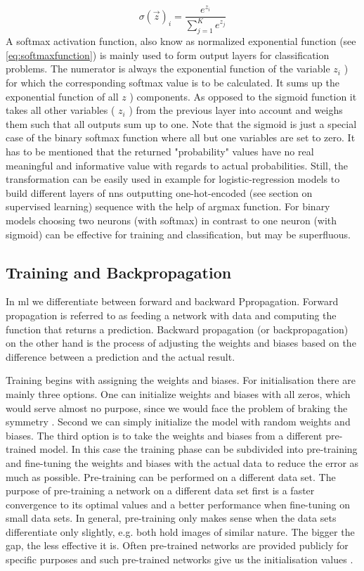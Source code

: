 \begin{equation}
   \sigma(\vec{z})_{i}=\frac{e^{z_{i}}}{\sum_{j=1}^{K} e^{z_{j}}}
\label{eq:softmaxfunction}
\end{equation}
A softmax activation function, also know as normalized exponential function (see \cref{eq:softmaxfunction}) is mainly used to form output layers for classification problems. The numerator is always the exponential function of the variable \( z_i \) ) for which the corresponding softmax value is to be calculated. It sums up the exponential function of all \( z \) ) components. As opposed to the sigmoid function it takes all other variables ( \( z_i \) ) from the previous layer into account and weighs them such that all outputs sum up to one. Note that the sigmoid is just a special case of the binary softmax function where all but one variables are set to zero. It has to be mentioned that the returned "probability" values have no real meaningful and informative value with regards to actual probabilities. Still, the transformation can be easily used in example for \gls{logistic-regression} models to build different layers of \acrshort{nn}s outputting one-hot-encoded (see section on supervised learning) sequence with the help of argmax function. For binary models choosing two neurons (with softmax) in contrast to one neuron (with sigmoid) can be effective for training and classification, but may be superfluous.

\subsection{Training and Backpropagation}

In \acrshort{ml} we differentiate between forward and backward Ppropagation. Forward propagation is referred to as feeding a network with data and computing the function that returns a prediction. Backward propagation (or backpropagation) on the other hand is the process of adjusting the weights and biases based on the difference between a prediction and the actual result.

Training begins with assigning the weights and biases. For initialisation there are mainly three options. One can initialize weights and biases with all zeros, which would serve almost no purpose, since we would face the problem of braking the symmetry \cite{Thimm.1995}. Second we can simply initialize the model with random weights and biases. The third option is to take the weights and biases from a different pre-trained model. In this case the training phase can be subdivided into pre-training and fine-tuning the weights and biases with the actual data to reduce the error as much as possible. Pre-training can be performed on a different data set. The purpose of pre-training a network on a different data set first is a faster convergence to its optimal values and a better performance when fine-tuning on small data sets. In general, pre-training only makes sense when the data sets differentiate only slightly, e.g. both hold images of similar nature. The bigger the gap, the less effective it is. Often pre-trained networks are provided publicly for specific purposes and such pre-trained networks give us the initialisation values \cite{TorchContributors.2017}.

